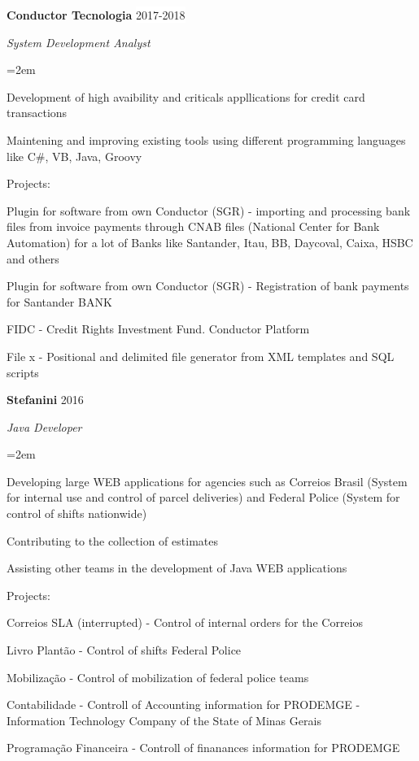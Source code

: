 \documentclass[paper=a4,fontsize=14pt]{article}
\let\olditemize\itemize
\let\endolditemize\enditemize
\renewenvironment{itemize}{%
    \small
    \olditemize
}{%
    \endolditemize
}
\newcommand{\EducationEntry}[4]{
		\noindent \textbf{#1} \hfill 			%
		\colorbox{White}{%
			\parbox{6em}{%
			\hfill\color{Black}#2}} \par		%
		\noindent \textit{#3} \par			%
		\noindent\hangindent=2em\hangafter=0 \small #4 	%
		\normalsize \par}
\newcommand{\WorkEntry}[4]{						%
		\noindent \textbf{#1} \hfill 				%
		\colorbox{White}{\color{Black}#2} \par			%
		\noindent \textit{#3} \par				%
		\noindent\hangindent=2em\hangafter=0 \small #4 		%
		\normalsize \par \vspace*{.5em}}
\begin{document}
\WorkEntry{Conductor Tecnologia}{2017-2018}{System Development Analyst}{
\begin{itemize}
    \item Development of high avaibility and criticals appllications for credit card transactions
    \item Maintening and improving  existing tools using different programming languages like C\#, VB, Java, Groovy
    \item Projects:
    \begin{itemize}
        \item Plugin for software from own Conductor (SGR) - importing and processing bank files from invoice payments through CNAB files (National Center for Bank Automation) for a lot of Banks like Santander, Itau, BB, Daycoval, Caixa, HSBC and others
        \item Plugin for software from own Conductor (SGR) - Registration of bank payments for Santander BANK
        \item FIDC - Credit Rights Investment Fund. Conductor Platform
        \item File x - Positional and delimited file generator from XML templates and SQL scripts
    \end{itemize}
\end{itemize}
}

\WorkEntry{Stefanini}{2016}{Java Developer}{
\begin{itemize}
    \item Developing large WEB applications for agencies such as Correios Brasil (System for internal use and control of parcel deliveries) and Federal Police (System for control of shifts nationwide)
    \item Contributing to the collection of estimates
    \item Assisting other teams in the development of Java WEB applications
    \item Projects:
    \begin{itemize}
        \item Correios SLA (interrupted) - Control of internal orders for the Correios
        \item Livro Plantão - Control of shifts Federal Police
        \item Mobilização - Control of mobilization of federal police teams
        \item Contabilidade - Controll of Accounting information for PRODEMGE - Information Technology Company of the State of Minas Gerais
        \item Programação Financeira - Controll of finanances information for PRODEMGE
    \end{itemize}
\end{itemize}
}
\end{document}
